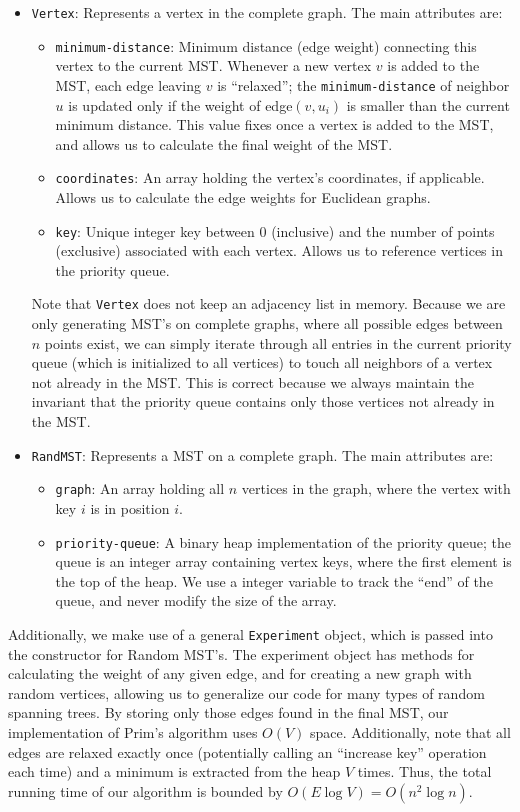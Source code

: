 \documentclass[a4paper]{article}
\begin{document}
\begin{itemize}
	\item \texttt{Vertex}: Represents a vertex in the complete graph. The main attributes are:
	\begin{itemize}
		\item \texttt{minimum-distance}: Minimum distance (edge weight) connecting this vertex to the current MST. Whenever a new vertex $v$ is added to the MST, each edge leaving $v$ is ``relaxed''; the \texttt{minimum-distance} of neighbor $u$ is updated only if the weight of edge$(v, u_i)$ is smaller than the current minimum distance. This value fixes once a vertex is added to the MST, and allows us to calculate the final weight of the MST.
		\item \texttt{coordinates}: An array holding the vertex's coordinates, if applicable. Allows us to calculate the edge weights for Euclidean graphs.
		\item \texttt{key}: Unique integer key between 0 (inclusive) and the number of points (exclusive) associated with each vertex. Allows us to reference vertices in the priority queue.
	\end{itemize}
	Note that \texttt{Vertex} does not keep an adjacency list in memory. Because we are only generating MST's on complete graphs, where all possible edges between $n$ points exist, we can simply iterate through all entries in the current priority queue (which is initialized to all vertices) to touch all neighbors of a vertex not already in the MST. This is correct because we always maintain the invariant that the priority queue contains only those vertices not already in the MST. 
	
	\item \texttt{RandMST}: Represents a MST on a complete graph. The main attributes are: 
	\begin{itemize}
		\item \texttt{graph}: An array holding all $n$ vertices in the graph, where the vertex with key $i$ is in position $i$.
		\item \texttt{priority-queue}: A binary heap implementation of the priority queue; the queue is an integer array containing vertex keys, where the first element is the top of the heap. We use a integer variable to track the ``end'' of the queue, and never modify the size of the array.
	\end{itemize}
\end{itemize}

Additionally, we make use of a general \texttt{Experiment} object, which is passed into the constructor for Random MST's. The experiment object has methods for calculating the weight of any given edge, and for creating a new graph with random vertices, allowing us to generalize our code for many types of random spanning trees. By storing only those edges found in the final MST, our implementation of Prim's algorithm uses $O(V)$ space. Additionally, note that all edges are relaxed exactly once (potentially calling an ``increase key'' operation each time) and a minimum is extracted from the heap $V$ times. Thus, the total running time of our algorithm is bounded by $O(E\log V) = O(n^2\log n)$.
\end{document}
